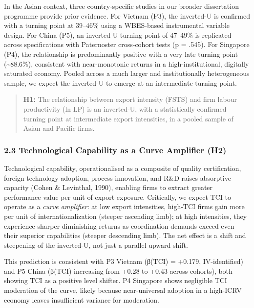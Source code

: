 \documentclass[
  12pt,a4paper]{article}
\begin{document}
In the Asian context, three country-specific studies in our broader
dissertation programme provide prior evidence. For Vietnam (P3), the
inverted-U is confirmed with a turning point at 39--46\% using a
WBES-based instrumental variable design. For China (P5), an inverted-U
turning point of 47--49\% is replicated across specifications with
Paternoster cross-cohort tests (p = .545). For Singapore (P4), the
relationship is predominantly positive with a very late turning point
(\textasciitilde88.6\%), consistent with near-monotonic returns in a
high-institutional, digitally saturated economy. Pooled across a much
larger and institutionally heterogeneous sample, we expect the
inverted-U to emerge at an intermediate turning point.

\begin{quote}
\textbf{H1:} The relationship between export intensity (FSTS) and firm
labour productivity (ln LP) is an inverted-U, with a statistically
confirmed turning point at intermediate export intensities, in a pooled
sample of Asian and Pacific firms.
\end{quote}

\hypertarget{technological-capability-as-a-curve-amplifier-h2}{%
\subsubsection{2.3 Technological Capability as a Curve Amplifier
(H2)}\label{technological-capability-as-a-curve-amplifier-h2}}

Technological capability, operationalised as a composite of quality
certification, foreign-technology adoption, process innovation, and R\&D
raises absorptive capacity (Cohen \& Levinthal, 1990), enabling firms to
extract greater performance value per unit of export exposure.
Critically, we expect TCI to operate as a \emph{curve amplifier}: at low
export intensities, high-TCI firms gain more per unit of
internationalization (steeper ascending limb); at high intensities, they
experience sharper diminishing returns as coordination demands exceed
even their superior capabilities (steeper descending limb). The net
effect is a shift and steepening of the inverted-U, not just a parallel
upward shift.

This prediction is consistent with P3 Vietnam (β(TCI) = +0.179,
IV-identified) and P5 China (β(TCI) increasing from +0.28 to +0.43
across cohorts), both showing TCI as a positive level shifter. P4
Singapore shows negligible TCI moderation of the curve, likely because
near-universal adoption in a high-ICRV economy leaves insufficient
variance for moderation.
\end{document}
